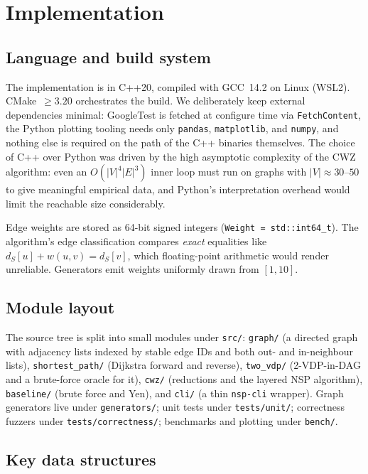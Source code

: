 \chapter{Implementation}
\label{ch:implementation}

\section{Language and build system}

The implementation is in C++20, compiled with GCC~14.2 on Linux (WSL2).
CMake~$\ge 3.20$ orchestrates the build. We deliberately keep external
dependencies minimal: GoogleTest is fetched at configure time via
\texttt{FetchContent}, the Python plotting tooling needs only
\texttt{pandas}, \texttt{matplotlib}, and \texttt{numpy}, and nothing
else is required on the path of the C++ binaries themselves. The choice
of C++ over Python was driven by the high asymptotic complexity of the
CWZ algorithm: even an $O(|V|^{4}|E|^{3})$ inner loop must run on graphs
with $|V|\approx 30$--$50$ to give meaningful empirical data, and
Python's interpretation overhead would limit the reachable size
considerably.

Edge weights are stored as 64-bit signed integers (\texttt{Weight =
std::int64\_t}). The algorithm's edge classification compares
\textit{exact} equalities like $d_S[u]+w(u,v)=d_S[v]$, which
floating-point arithmetic would render unreliable. Generators emit
weights uniformly drawn from $[1, 10]$.

\section{Module layout}

The source tree is split into small modules under \texttt{src/}:
\texttt{graph/} (a directed graph with adjacency lists indexed by stable
edge IDs and both out- and in-neighbour lists), \texttt{shortest\_path/}
(Dijkstra forward and reverse), \texttt{two\_vdp/} (2-VDP-in-DAG and a
brute-force oracle for it), \texttt{cwz/} (reductions and the layered
NSP algorithm), \texttt{baseline/} (brute force and Yen), and
\texttt{cli/} (a thin \texttt{nsp-cli} wrapper). Graph generators live
under \texttt{generators/}; unit tests under \texttt{tests/unit/};
correctness fuzzers under \texttt{tests/correctness/}; benchmarks and
plotting under \texttt{bench/}.

\section{Key data structures}

